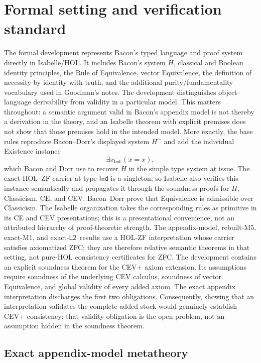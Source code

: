 \documentclass[12pt,leqno]{article}
\theoremstyle{plain}
\theoremstyle{definition}
\newcommand{\Ltwo}{\ensuremath{\mathsf{L2}}}
\begin{document}
\section{Formal setting and verification standard}

The formal development represents Bacon's typed language and proof system
directly in Isabelle/HOL.  It includes Bacon's system \(H\), classical and Boolean
identity principles, the Rule of Equivalence, vector Equivalence, the
definition of necessity by identity with truth, and the additional
purity/fundamentality vocabulary used in Goodman's notes.  The development
distinguishes object-language derivability from validity in a particular
model.  This matters throughout: a semantic argument valid in Bacon's
appendix model is not thereby a derivation in the theory, and an Isabelle
theorem with explicit premises does not show that those premises hold in the
intended model.
More exactly, the base rules reproduce Bacon--Dorr's displayed system
\(H^{-}\) and add the individual Existence instance
\[
 \exists x_{\mathsf{Ind}}\,(x=x),
\]
which Bacon and Dorr use to recover \(H\) in the simple type system at issue.
The exact HOL--ZF carrier at type \(\mathsf{Ind}\) is a singleton, so Isabelle
also verifies this instance semantically and propagates it through the
soundness proofs for \(H\), Classicism, CE, and CEV.  Bacon--Dorr prove that
Equivalence is admissible over Classicism.  The Isabelle organization takes
the corresponding rules as primitive in its CE and CEV presentations; this
is a presentational convenience, not an attributed hierarchy of
proof-theoretic strength.
The appendix-model, rebuilt-M5, exact-M1, and exact-\Ltwo\ results use a HOL-ZF
interpretation whose carrier satisfies axiomatized ZFC; they are therefore
relative semantic theorems in that setting, not pure-HOL consistency
certificates for ZFC.
The development contains an explicit soundness theorem for the CEV+ axiom
extension.  Its assumptions require soundness of the underlying CEV calculus,
soundness of vector Equivalence, and global validity of every added axiom.
The exact appendix interpretation discharges the first two obligations.
Consequently, showing that an interpretation validates the complete added
stock would genuinely establish CEV+ consistency; that validity obligation is
the open problem, not an assumption hidden in the soundness theorem.

\subsection{Exact appendix-model metatheory}
\end{document}
